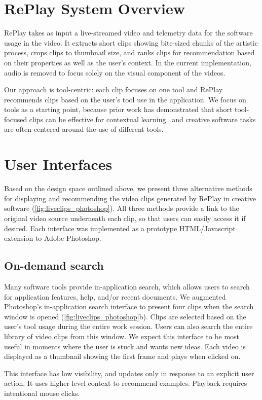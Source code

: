 \section{RePlay System Overview}
RePlay takes as input a live-streamed video and telemetry data for the software usage in the video. It extracts short clips showing bite-sized chunks of the artistic process, crops clips to thumbnail size, and ranks clips for recommendation based on their properties as well as the user's context. In the current implementation, audio is removed to focus solely on the visual component of the videos. %

Our approach is tool-centric: each clip focuses on one tool and RePlay recommends clips based on the user's tool use in the application. We focus on tools as a starting point, because prior work has demonstrated that short tool-focused clips can be effective for contextual learning~\cite{Grossman2010a} and creative software tasks are often centered around the use of different tools.

\section{User Interfaces}
Based on the design space outlined above, we present three alternative methods for displaying and recommending the video clips generated by RePlay in creative software (\autoref{fig:liveclips_photoshop}).
All three methods provide a link to the original video source underneath each clip, so that users can easily access it if desired. Each interface was implemented as a prototype HTML/Javascript extension to Adobe Photoshop.

\subsection{On-demand search}
Many software tools provide in-application search, which allows users to search for application features, help, and/or recent documents. We augmented Photoshop's in-application search interface to present four clips when the search window is opened (\autoref{fig:liveclips_photoshop}b). Clips are selected based on the user's tool usage during the entire work session. Users can also search the entire library of video clips from this window. We expect this interface to be most useful in moments where the user is stuck and wants new ideas. Each video is displayed as a thumbnail showing the first frame and plays when clicked on.

This interface has low visibility, and updates only in response to an explicit user action. It uses higher-level context to recommend examples. Playback requires intentional mouse clicks.

